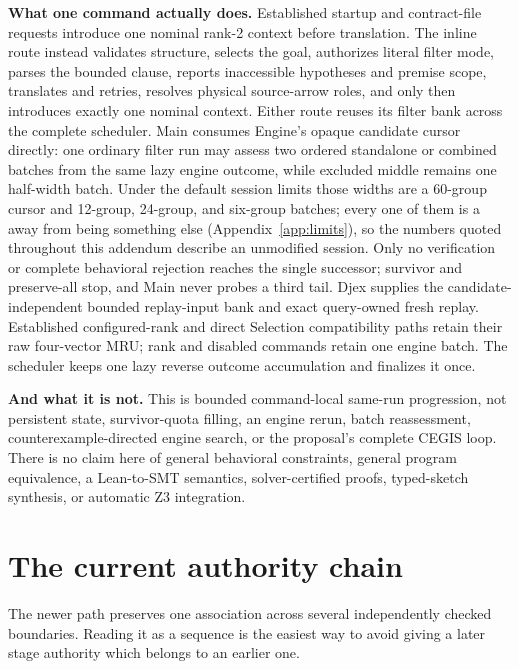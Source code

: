 \documentclass[10pt,letterpaper,oneside]{report}
\newcommand{\code}[1]{\texttt{\detokenize{#1}}}
\begin{document}
  \textbf{What one command actually does.} Established startup and contract-file requests introduce one nominal rank-2 context before translation. The inline route instead validates structure, selects the goal, authorizes literal filter mode, parses the bounded clause, reports inaccessible hypotheses and premise scope, translates and retries, resolves physical source-arrow roles, and only then introduces exactly one nominal context. Either route reuses its filter bank across the complete scheduler. Main consumes Engine's opaque candidate cursor directly: one ordinary filter run may assess two ordered standalone or combined batches from the same lazy engine outcome, while excluded middle remains one half-width batch. Under the default session limits those widths are a 60-group cursor and 12-group, 24-group, and six-group batches; every one of them is a \code{:set} away from being something else (Appendix~\ref{app:limits}), so the numbers quoted throughout this addendum describe an unmodified session. Only no verification or complete behavioral rejection reaches the single successor; survivor and preserve-all stop, and Main never probes a third tail. Djex supplies the candidate-independent bounded replay-input bank and exact query-owned fresh replay. Established configured-rank and direct Selection compatibility paths retain their raw four-vector MRU; rank and disabled commands retain one engine batch. The scheduler keeps one lazy reverse outcome accumulation and finalizes it once.

  \textbf{And what it is not.} This is bounded command-local same-run progression, not persistent state, survivor-quota filling, an engine rerun, batch reassessment, counterexample-directed engine search, or the proposal's complete CEGIS loop. There is no claim here of general behavioral constraints, general program equivalence, a Lean-to-SMT semantics, solver-certified proofs, typed-sketch synthesis, or automatic Z3 integration.

\section*{The current authority chain}

The newer path preserves one association across several independently checked boundaries. Reading it as a sequence is the easiest way to avoid giving a later stage authority which belongs to an earlier one.
\end{document}
